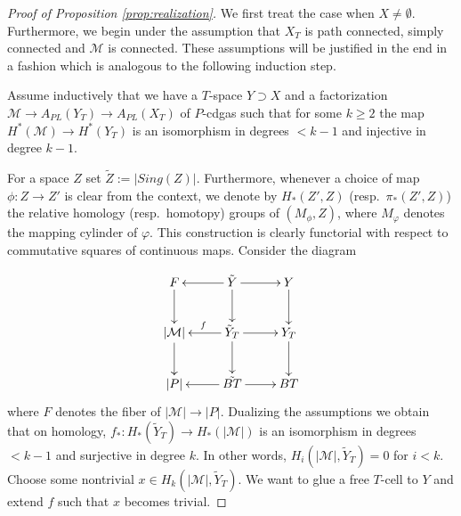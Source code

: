 \documentclass[12pt,a4paper]{article}
\theoremstyle{definition}
\begin{document}
\begin{proof}[Proof of Proposition \ref{prop:realization}]

We first treat the case when $X\neq \emptyset$. Furthermore, we begin under the assumption that $X_T$ is path connected, simply connected and $\mathcal{M}$ is connected. These assumptions will be justified in the end in a fashion which is analogous to the following induction step.

Assume inductively that we have a $T$-space $Y\supset X$ and a factorization $\mathcal{M}\rightarrow A_{PL}(Y_T)\rightarrow A_{PL}(X_T)$ of $P$-cdgas such that for some $k\geq 2$ the map $H^*(\mathcal{M})\rightarrow H^*(Y_T)$ is an isomorphism in degrees $<k-1$ and injective in degree $k-1$.

For a space $Z$ set $\tilde{Z}:=\vert Sing(Z)\vert$. Furthermore, whenever a choice of map $\phi\colon Z\rightarrow Z'$ is clear from the context, we denote by $H_*(Z',Z)$ (resp.\ $\pi_*(Z',Z)$) the relative homology (resp.\ homotopy) groups of $(M_\phi, Z)$, where $M_\varphi$ denotes the mapping cylinder of $\varphi$. This construction is clearly functorial with respect to commutative squares of continuous maps. Consider the diagram

\[\xymatrix{
F\ar[d] & \tilde{Y}\ar[d]\ar[l]\ar[r] & Y\ar[d]\\
\vert \mathcal{M}\vert\ar[d] & \tilde{Y}_T\ar[d]\ar[l]_f\ar[r] & Y_T\ar[d]\\
\vert P\vert & \tilde{BT}\ar[l]\ar[r]& BT
}\]
where $F$ denotes the fiber of $\vert \mathcal{M}\vert\rightarrow\vert P\vert$. Dualizing the assumptions we obtain that on homology, $f_*\colon H_*(\tilde{Y}_T)\rightarrow  H_*(\vert\mathcal{M}\vert)$ is an isomorphism in degrees $<k-1$ and surjective in degree $k$. In other words, $H_i(\vert \mathcal{M}\vert,\tilde{Y}_T)=0$ for $i<k$.  Choose some nontrivial $x\in H_k(\vert \mathcal{M}\vert,\tilde{Y}_T)$. We want to glue a free $T$-cell to $Y$ and extend $f$ such that $x$ becomes trivial.


\end{proof}
\end{document}
